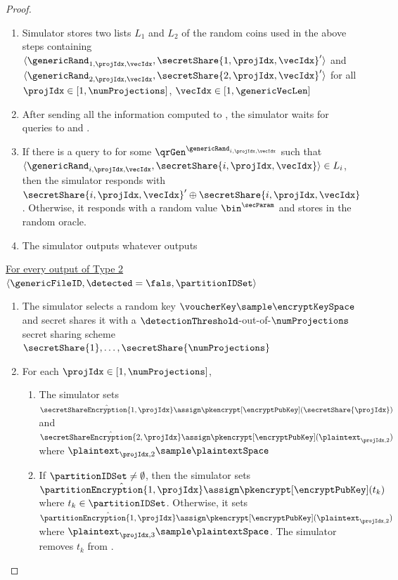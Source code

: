 \begin{proof}
\begin{enumerate}
\item Simulator stores two lists $L_1$ and $L_2$ of the random coins used in the above steps containing $\langle \genericRand_{1, \projIdx, \vecIdx}, \secretShare{1, \projIdx, \vecIdx}'\rangle$ and  $\langle \genericRand_{2, \projIdx, \vecIdx}, \secretShare{2, \projIdx, \vecIdx}'\rangle$ for all $\projIdx \in [1, \numProjections]$, $\vecIdx \in [1, \genericVecLen]$

\item After sending all the information computed to \server, the simulator waits for queries to \primeRO and \ro. 

\item If there is a query to \ro for some $\qrGen^{\genericRand_{i, \projIdx, \vecIdx}}$ such that  $\langle \genericRand_{i, \projIdx, \vecIdx}, \secretShare{i, \projIdx, \vecIdx} \rangle \in L_i$, then the simulator responds with $\secretShare{i, \projIdx, \vecIdx}' \oplus \secretShare{i, \projIdx, \vecIdx}$. Otherwise, it responds with a random value $\bin^{\secParam}$ and stores in the random oracle. 
\item The simulator outputs whatever \server outputs
\end{enumerate}


\smallskip\underline{For every output of Type 2 $\langle \genericFileID, \detected = \fals, \partitionIDSet \rangle$}

\begin{enumerate}


\item The simulator selects a random key $\voucherKey \sample \encryptKeySpace$ and secret shares it with a $\detectionThreshold$-out-of-$\numProjections$ secret sharing scheme $\secretShare{1}, \dots, \secretShare{\numProjections}$


\item For each $\projIdx \in [1, \numProjections]$,

\begin{enumerate}
\item The simulator sets $\hat{\secretShareEncryption{1, \projIdx}} \assign  \pkencrypt[\encryptPubKey](\secretShare{\projIdx})$ and $\hat{\secretShareEncryption{2, \projIdx}} \assign  \pkencrypt[\encryptPubKey](\plaintext_{\projIdx, 2})$  where $\plaintext_{\projIdx, 2} \sample \plaintextSpace$ 



\item If $\partitionIDSet \neq \emptyset$, then the simulator sets $\hat{\partitionEncryption{1, \projIdx}} \assign \pkencrypt[\encryptPubKey](t_k)$ where $t_k \in \partitionIDSet$. Otherwise, it sets $\hat{\partitionEncryption{1, \projIdx}} \assign \pkencrypt[\encryptPubKey](\plaintext_{\projIdx, 2})$ where $\plaintext_{\projIdx, 3} \sample \plaintextSpace$. The simulator removes $t_k$ from \partitionIDSet. 


\end{enumerate}
\end{enumerate}
\end{proof}
